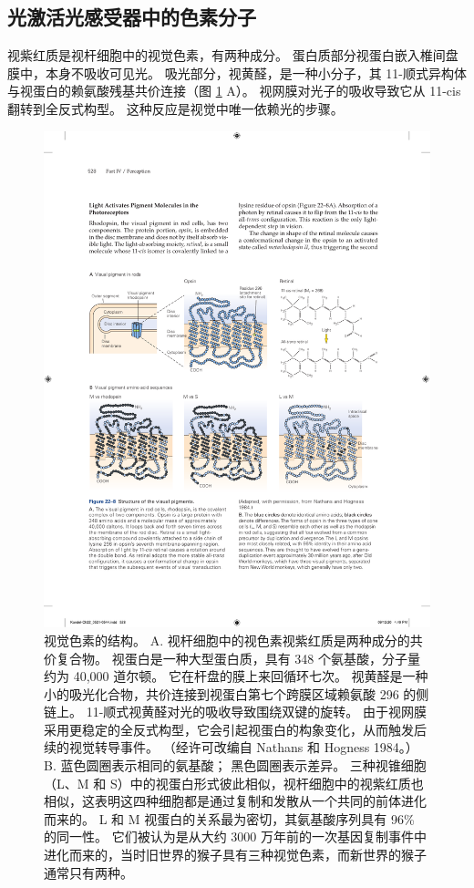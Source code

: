 \subsection{光激活光感受器中的色素分子}
视紫红质是视杆细胞中的视觉色素，有两种成分。 
蛋白质部分视蛋白嵌入椎间盘膜中，本身不吸收可见光。 
吸光部分，视黄醛，是一种小分子，其 11-顺式异构体与视蛋白的赖氨酸残基共价连接（图 \ref{fig:22_8} A）。 
视网膜对光子的吸收导致它从 11-cis 翻转到全反式构型。 
这种反应是视觉中唯一依赖光的步骤。

\begin{figure}[htbp]
	\centering
	\includegraphics[width=1.0\linewidth]{chap22/fig_22_8}
	\caption{视觉色素的结构。 
		A. 视杆细胞中的视色素视紫红质是两种成分的共价复合物。 
		视蛋白是一种大型蛋白质，具有 348 个氨基酸，分子量约为 40,000 道尔顿。 
		它在杆盘的膜上来回循环七次。 
		视黄醛是一种小的吸光化合物，共价连接到视蛋白第七个跨膜区域赖氨酸 296 的侧链上。 
		11-顺式视黄醛对光的吸收导致围绕双键的旋转。 
		由于视网膜采用更稳定的全反式构型，它会引起视蛋白的构象变化，从而触发后续的视觉转导事件。 （经许可改编自 Nathans 和 Hogness 1984。） 
		B. 蓝色圆圈表示相同的氨基酸； 黑色圆圈表示差异。 三种视锥细胞（L、M 和 S）中的视蛋白形式彼此相似，视杆细胞中的视紫红质也相似，这表明这四种细胞都是通过复制和发散从一个共同的前体进化而来的。 L 和 M 视蛋白的关系最为密切，其氨基酸序列具有 96\% 的同一性。 
		它们被认为是从大约 3000 万年前的一次基因复制事件中进化而来的，当时旧世界的猴子具有三种视觉色素，而新世界的猴子通常只有两种。}
	\label{fig:22_8}
\end{figure}


